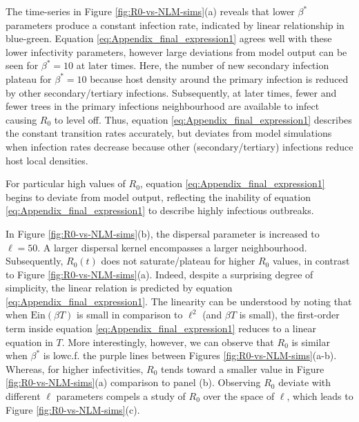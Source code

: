 The time-series in Figure \ref{fig:R0-vs-NLM-sims}(a) reveals that lower $\beta^*$ parameters produce a constant infection rate, indicated by linear relationship in blue-green.
Equation \ref{eq:Appendix_final_expression1} agrees well with these lower infectivity parameters, however large deviations from model output can be seen for $\beta^*=10$ at later times. 
Here, the number of new secondary infection plateau for $\beta^*=10$ because host density around the primary infection is reduced by other secondary/tertiary infections. Subsequently, at later times, fewer and fewer trees in the primary infections neighbourhood are available to infect causing $R_0$ to level off.
Thus, equation \ref{eq:Appendix_final_expression1} describes the constant transition rates accurately, but deviates from model simulations when infection rates decrease because other (secondary/tertiary) infections reduce host local densities.



For particular high values of $R_0$, equation \ref{eq:Appendix_final_expression1} begins to deviate from model output, reflecting the inability of equation \ref{eq:Appendix_final_expression1}
to describe highly infectious outbreaks.

In Figure \ref{fig:R0-vs-NLM-sims}(b), the dispersal parameter is increased to $\ell=50$.
A larger dispersal kernel encompasses a larger neighbourhood.
Subsequently, $R_0(t)$ does not saturate/plateau for higher $R_0$ values, in contrast to Figure \ref{fig:R0-vs-NLM-sims}(a).
Indeed, despite a surprising degree of simplicity, the linear relation is predicted by equation \ref{eq:Appendix_final_expression1}.
The linearity can be understood by noting that when $\mathrm{Ein}(\beta T)$ is small in comparison to $\ell^2$ (and $\beta T$ is small), the first-order term inside equation \ref{eq:Appendix_final_expression1} reduces to a linear equation in $T$.
More interestingly, however, we can observe that $R_0$ is similar when $\beta^*$ is low\textemdash c.f. the purple lines between Figures \ref{fig:R0-vs-NLM-sims}(a-b).
Whereas, for higher infectivities, $R_0$ tends toward a smaller value in Figure \ref{fig:R0-vs-NLM-sims}(a) comparison to panel (b).
Observing $R_0$ deviate with different $\ell$ parameters compels a study of $R_0$ over the space of $\ell$, which leads to Figure \ref{fig:R0-vs-NLM-sims}(c).

